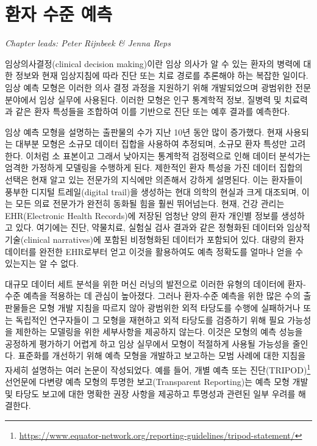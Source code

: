 \documentclass[11pt]{book}
\let\rmarkdownfootnote\footnote%
\def\footnote{\protect\rmarkdownfootnote}
\theoremstyle{definition}
\theoremstyle{definition}
\theoremstyle{definition}
\theoremstyle{remark}
\begin{document}
\chapter{환자 수준 예측}\label{PatientLevelPrediction}

\emph{Chapter leads: Peter Rijnbeek \& Jenna Reps}


임상의사결정(clinical decision making)이란 임상 의사가 알 수 있는 환자의
병력에 대한 정보와 현재 임상지침에 따라 진단 또는 치료 경로를 추론해야
하는 복잡한 일이다. 임상 예측 모형은 이러한 의사 결정 과정을 지원하기
위해 개발되었으며 광범위한 전문 분야에서 임상 실무에 사용된다. 이러한
모형은 인구 통계학적 정보, 질병력 및 치료력과 같은 환자 특성들을
조합하여 이를 기반으로 진단 또는 예후 결과를 예측한다.
 

임상 예측 모형을 설명하는 출판물의 수가 지난 10년 동안 많이 증가했다.
현재 사용되는 대부분 모형은 소규모 데이터 집합을 사용하여 추정되며,
소규모 환자 특성만 고려한다. 이처럼 소 표본이고 그래서 낮아지는 통계학적
검정력으로 인해 데이터 분석가는 엄격한 가정하게 모델링을 수행하게 된다.
제한적인 환자 특성을 가진 데이터 집합의 선택은 현재 알고 있는 전문가의
지식에만 의존해서 강하게 설명된다. 이는 환자들이 풍부한 디지털
트레일(digital trail)을 생성하는 현대 의학의 현실과 크게 대조되며, 이는
모든 의료 전문가가 완전히 동화될 힘을 훨씬 뛰어넘는다. 현재, 건강 관리는
EHR(Electronic Health Records)에 저장된 엄청난 양의 환자 개인별 정보를
생성하고 있다. 여기에는 진단, 약물치료, 실험실 검사 결과와 같은 정형화된
데이터와 임상적 기술(clinical narratives)에 포함된 비정형화된 데이터가
포함되어 있다. 대량의 환자 데이터를 완전한 EHR로부터 얻고 이것을
활용하여도 예측 정확도를 얼마나 얻을 수 있는지는 알 수 없다.

대규모 데이터 세트 분석을 위한 머신 러닝의 발전으로 이러한 유형의
데이터에 환자-수준 예측을 적용하는 데 관심이 높아졌다. 그러나 환자-수준
예측을 위한 많은 수의 출판물들은 모형 개발 지침을 따르지 않아 광범위한
외적 타당도를 수행에 실패하거나 또는 독립적인 연구자들이 그 모형을
재현하고 외적 타당도를 검증하기 위해 필요 가능성을 제한하는 모델링을
위한 세부사항을 제공하지 않는다. 이것은 모형의 예측 성능을 공정하게
평가하기 어렵게 하고 임상 실무에서 모형이 적절하게 사용될 가능성을
줄인다. 표준화를 개선하기 위해 예측 모형을 개발하고 보고하는 모범 사례에
대한 지침을 자세히 설명하는 여러 논문이 작성되었다. 예를 들어, 개별 예측
또는 진단(TRIPOD)\footnote{\url{https://www.equator-network.org/reporting-guidelines/tripod-statement/}}
선언문에 다변량 예측 모형의 투명한 보고(Transparent Reporting)는 예측
모형 개발 및 타당도 보고에 대한 명확한 권장 사항을 제공하고 투명성과
관련된 일부 우려를 해결한다.  
\end{document}
